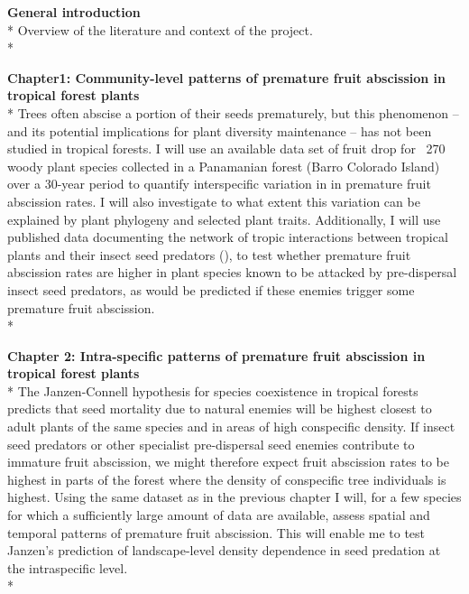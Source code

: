 \documentclass[12pt,a4]{RDGThesis}
\begin{document}
\textbf{General introduction} \\*
    Overview of the literature and context of the project.\\*
    
\textbf{Chapter1: Community-level patterns of premature fruit abscission in tropical forest plants} \\*
    Trees often abscise a portion of their seeds prematurely, but this phenomenon – and its potential implications for plant diversity maintenance – has not been studied in tropical forests. I will use an available data set of fruit drop for ~270 woody plant species collected in a Panamanian forest (Barro Colorado Island) over a 30-year period to quantify interspecific variation in in premature fruit abscission rates. I will also investigate to what extent this variation can be explained by plant phylogeny and selected plant traits. Additionally, I will use published data documenting the network of tropic interactions between tropical plants and their insect seed predators (\cite{gripenbergHighlyResolvedFood2019}), to test whether premature fruit abscission rates are higher in plant species known to be attacked by pre-dispersal insect seed predators, as would be predicted if these enemies trigger some premature fruit abscission.\\*

\textbf{Chapter 2: Intra-specific patterns of premature fruit abscission in tropical forest plants} \\*
    The Janzen-Connell hypothesis for species coexistence in tropical forests predicts that seed mortality due to natural enemies will be highest closest to adult plants of the same species and in areas of high conspecific density. If insect seed predators or other specialist pre-dispersal seed enemies contribute to immature fruit abscission, we might therefore expect fruit abscission rates to be highest in parts of the forest where the density of conspecific tree individuals is highest. Using the same dataset as in the previous chapter I will, for a few species for which a sufficiently large amount of data are available, assess spatial and temporal patterns of premature fruit abscission. This will enable me to test Janzen’s prediction of landscape-level density dependence in seed predation at the intraspecific level.\\*
\end{document}
